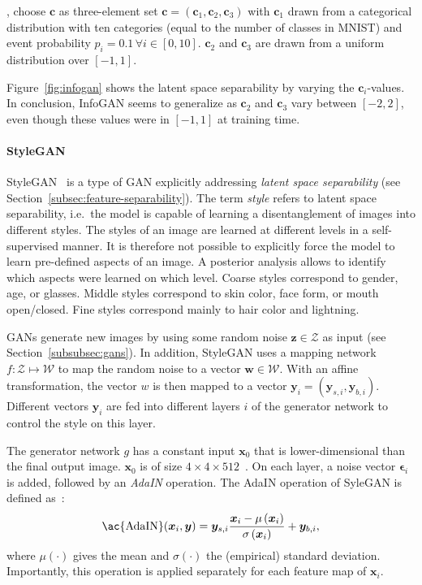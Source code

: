 , \citet{chen2016infogan} choose $\bm{c}$ as three-element set $\bm{c} = (\bm{c}_1, \bm{c}_2, \bm{c}_3)$ with $\bm{c}_1$ drawn from a categorical distribution with ten categories (equal to the number of classes in MNIST) and event probability $p_i=0.1 \, \forall i \in [0, 10]$.
$\bm{c}_2$ and $\bm{c}_3$ are drawn from a uniform distribution over $[-1, 1]$.

Figure~\ref{fig:infogan} shows the latent space separability by varying the $\bm{c}_i$-values.
In conclusion, InfoGAN seems to generalize as $\bm{c}_2$ and $\bm{c}_3$ vary between $[-2, 2]$, even though these values were in $[-1, 1]$ at training time.

\paragraph{StyleGAN}
StyleGAN~\citep{karras2019style} is a type of \ac{GAN} explicitly addressing \textit{latent space separability} (see Section~\ref{subsec:feature-separability}).
The term \textit{style} refers to latent space separability, i.e.~the model is capable of learning a disentanglement of images into different styles.
The styles of an image are learned at different levels in a self-supervised manner.
It is therefore not possible to explicitly force the model to learn pre-defined aspects of an image.
A posterior analysis allows to identify which aspects were learned on which level.
Coarse styles correspond to gender, age, or glasses.
Middle styles correspond to skin color, face form, or mouth open/closed.
Fine styles correspond mainly to hair color and lightning.

\acp{GAN} generate new images by using some random noise $\bm{z}\in \mathcal{Z}$ as input (see Section~\ref{subsubsec:gans}).
In addition, StyleGAN uses a mapping network $f: \mathcal{Z}\mapsto \mathcal{W}$ to map the random noise to a vector $\bm{w}\in \mathcal{W}$.
With an affine transformation, the vector $w$ is then mapped to a vector $\bm{y}_i = (\bm{y}_{s,i}, \bm{y}_{b,i})$.
Different vectors $\bm{y}_i$ are fed into different layers $i$ of the generator network to control the style on this layer.

The generator network $g$ has a constant input $\bm{x}_0$ that is lower-dimensional than the final output image.
$\bm{x}_0$ is of size $4\times 4\times 512$~\citep{karras2019style}.
On each layer, a noise vector $\bm{\epsilon}_i$ is added, followed by an \textit{\acf{AdaIN}} operation.
The \ac{AdaIN} operation of SyleGAN is defined as~\citep{karras2019style}:
\begin{align}
    \text{\ac{AdaIN}}(\bm{x}_i, \bm{y}) = \bm{y}_{s, i} \frac{\bm{x}_{i}-\mu\left(\bm{x}_{i}\right)}{\sigma\left(\bm{x}_{i}\right)}+\bm{y}_{b, i},
\end{align}
where $\mu(\cdot)$ gives the mean and $\sigma(\cdot)$ the (empirical) standard deviation.
Importantly, this operation is applied separately for each feature map of $\bm{x}_i$.


